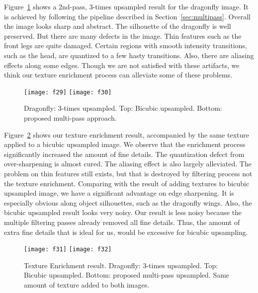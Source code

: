 Figure~\ref{fig:2ndpassDragonfly} shows a 2nd-pass, 3-times upsampled result for the dragonfly image. It is achieved by following the pipeline described in Section~\ref{sec:multipass}. Overall the image looks sharp and abstract. The silhouette of the dragonfly is well preserved. But there are many defects in the image. Thin features such as the front legs are quite damaged. Certain regions with smooth intensity transitions, such as the head, are quantized to a few hasty transitions. Also, there are aliasing effects along some edges. Though we are not satisfied with these artifacts, we think our texture enrichment process can alleviate some of these problems.

\begin{figure}[htbp]\centering
\texttt{[image: f29]}\vspace{1.1mm}
\texttt{[image: f30]}
\caption{Dragonfly: 3-times upsampled. Top: Bicubic upsampled. Bottom: proposed multi-pass approach.}
\label{fig:2ndpassDragonfly}
\end{figure}

Figure~\ref{fig:textureCompwithBicubic} shows our texture enrichment result, accompanied by the same texture applied to a bicubic upsampled image. We observe that the enrichment process significantly increased the amount of fine details. The quantization defect from over-sharpening is almost cured. The aliasing effect is also largely alleviated. The problem on thin features still exists, but that is destroyed by filtering process not the texture enrichment. Comparing with the result of adding textures to bicubic upsampled image, we have a significant advantage on edge sharpening. It is especially obvious along object silhouettes, such as the dragonfly wings. Also, the bicubic upsampled result looks very noisy. Our result is less noisy because the multiple filtering passes already removed all fine details. Thus, the amount of extra fine details that is ideal for us, would be excessive for bicubic upsampling. 

\begin{figure}[htbp]\centering
\texttt{[image: f31]}\vspace{1.1mm}
\texttt{[image: f32]}
\caption{Texture Enrichment result. Dragonfly: 3-times upsampled. Top: Bicubic upsampled. Bottom: proposed multi-pass upsampled. Same amount of texture added to both images.}
\label{fig:textureCompwithBicubic}
\end{figure}

